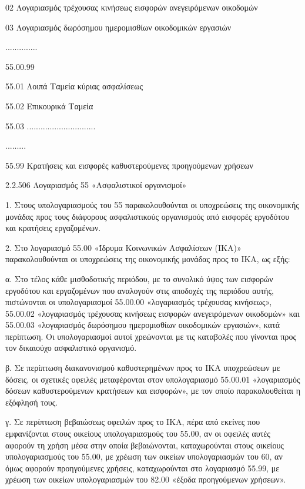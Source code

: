 \documentclass[A4,10pt,greek]{book}
\begin{document}
                               02   Λογαριασμός τρέχουσας κινήσεως εισφορών ανεγειρόμενων
                                      οικοδομών

                               03   Λογαριασμός δωρόσημου ημερομισθίων οικοδομικών
                                      εργασιών

                    ..............

                    55.00.99

        55.01   Λοιπά Ταμεία κύριας ασφαλίσεως

        55.02   Επικουρικά Ταμεία

        55.03   ..............................

        .........

        55.99   Κρατήσεις και εισφορές καθυστερούμενες προηγούμενων χρήσεων

 

2.2.506 Λογαριασμός 55 «Ασφαλιστικοί οργανισμοί»

1. Στους υπολογαριασμούς του 55 παρακολουθούνται οι υποχρεώσεις της οικονομικής μονάδας προς τους διάφορους ασφαλιστικούς οργανισμούς από εισφορές εργοδότου και κρατήσεις εργαζομένων.

2. Στο λογαριασμό 55.00 «Ίδρυμα Κοινωνικών Ασφαλίσεων (ΙΚΑ)» παρακολουθούνται οι υποχρεώσεις της οικονομικής μονάδας προς το ΙΚΑ, ως εξής:

α. Στο τέλος κάθε μισθοδοτικής περιόδου, με το συνολικό ύψος των εισφορών εργοδότου και εργαζομένων που αναλογούν στις αποδοχές της περιόδου αυτής, πιστώνονται οι υπολογαριασμοί 55.00.00 «λογαριασμός τρέχουσας κινήσεως», 55.00.02 «λογαριασμός τρέχουσας κινήσεως εισφορών ανεγειρόμενων οικοδομών» και 55.00.03 «λογαριασμός δωρόσημου ημερομισθίων οικοδομικών εργασιών», κατά περίπτωση. Οι υπολογαριασμοί αυτοί χρεώνονται με τις καταβολές που γίνονται προς τον δικαιούχο ασφαλιστικό οργανισμό.

β. Σε περίπτωση διακανονισμού καθυστερημένων προς το ΙΚΑ υποχρεώσεων με δόσεις, οι σχετικές οφειλές μεταφέρονται στον υπολογαριασμό 55.00.01 «λογαριασμός δόσεων καθυστερούμενων κρατήσεων και εισφορών», με τον οποίο παρακολουθείται η εξόφλησή τους.

γ. Σε περίπτωση βεβαιώσεως οφειλών προς το ΙΚΑ, πέρα από εκείνες που εμφανίζονται στους οικείους υπολογαριασμούς του 55.00, αν οι οφειλές αυτές αφορούν τη χρήση μέσα στην οποία βεβαιώνονται, καταχωρούνται στους οικείους υπολογαριασμούς του 55.00, με χρέωση των οικείων υπολογαριασμών του 60, αν όμως αφορούν προηγούμενες χρήσεις, καταχωρούνται στο λογαριασμό 55.99, με χρέωση των οικείων υπολογαριασμών του 82.00 «έξοδα προηγούμενων χρήσεων».
\end{document}
